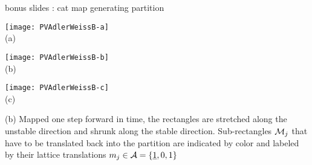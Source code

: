 \begin{frame}{bonus slides : cat map generating partition}
\begin{center}
            \begin{minipage}[c]{0.23\textwidth}\begin{center}
\texttt{[image: PVAdlerWeissB-a]}\\(a)
            \end{center}\end{minipage}
            \begin{minipage}[c]{0.23\textwidth}\begin{center}
\texttt{[image: PVAdlerWeissB-b]}\\(b)
            \end{center}\end{minipage}
            \begin{minipage}[c]{0.23\textwidth}\begin{center}
\texttt{[image: PVAdlerWeissB-c]}\\(c)
            \end{center}\end{minipage}
\end{center}
(b)
Mapped one step forward in time, the rectangles are stretched along the
unstable direction and shrunk along the stable direction. Sub-rectangles
$\mathcal{M}_j$ that have to be translated back into the partition are indicated by
color and labeled by their lattice translations
${m_{j}}\in\mathcal{A}=\{\underline{1},0,1\}$
\end{frame}

